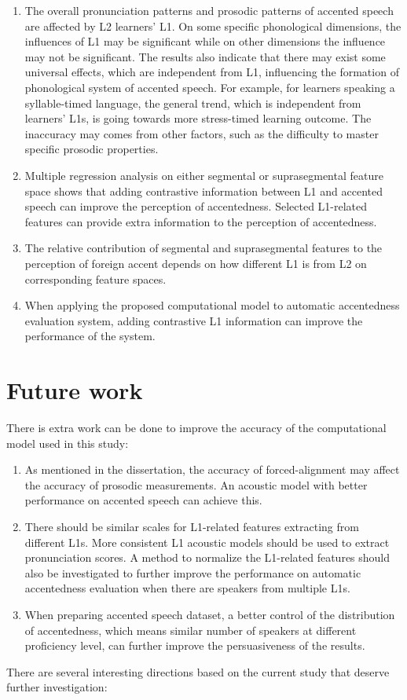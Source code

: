 \begin{enumerate}
\item The overall pronunciation patterns and prosodic patterns of accented speech are affected by L2 learners' L1. On some specific phonological dimensions, the influences of L1 may be significant while on other dimensions the influence may not be significant. The results also indicate that there may exist some universal effects, which are independent from L1, influencing the formation of phonological system of accented speech. For example, for learners speaking a syllable-timed language, the general trend, which is independent from learners' L1s, is going towards more stress-timed learning outcome. The inaccuracy may comes from other factors, such as the difficulty to master specific prosodic properties.
\item Multiple regression analysis on either segmental or suprasegmental feature space shows that adding contrastive information between L1 and accented speech can improve the perception of accentedness. Selected L1-related features can provide extra information to the perception of accentedness.
\item The relative contribution of segmental and suprasegmental features to the perception of foreign accent depends on how different L1 is from L2 on corresponding feature spaces.
\item When applying the proposed computational model to automatic accentedness evaluation system, adding contrastive L1 information can improve the performance of the system.
\end{enumerate}


\section{Future work}

There is extra work can be done to improve the accuracy of the computational model used in this study:

\begin{enumerate}
\item As mentioned in the dissertation, the accuracy of forced-alignment may affect the accuracy of prosodic measurements. An acoustic model with better performance on accented speech can achieve this.
\item There should be similar scales for L1-related features extracting from different L1s. More consistent L1 acoustic models should be used to extract pronunciation scores. A method to normalize the L1-related features should also be investigated to further improve the performance on automatic accentedness evaluation when there are speakers from multiple L1s.
\item When preparing accented speech dataset, a better control of the distribution of accentedness, which means similar number of speakers at different proficiency level, can further improve the persuasiveness of the results.
\end{enumerate}
There are several interesting directions based on the current study that deserve further investigation:

